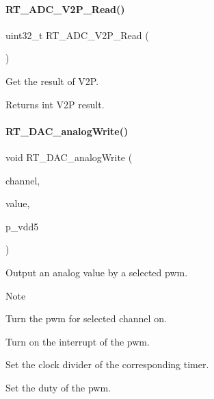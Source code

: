 \paragraph{\texorpdfstring{R\+T\+\_\+\+A\+D\+C\+\_\+\+V2\+P\+\_\+\+Read()}{RT\_ADC\_V2P\_Read()}}
{\footnotesize\ttfamily uint32\+\_\+t R\+T\+\_\+\+A\+D\+C\+\_\+\+V2\+P\+\_\+\+Read (\begin{DoxyParamCaption}{ }\end{DoxyParamCaption})}



Get the result of V2P. 

\begin{DoxyReturn}{Returns}
int V2P result. 
\end{DoxyReturn}
\mbox{\label{a00002_ae07217c068930cb51221cac4b42d5338}} 
\paragraph{\texorpdfstring{R\+T\+\_\+\+D\+A\+C\+\_\+analog\+Write()}{RT\_DAC\_analogWrite()}}
{\footnotesize\ttfamily void R\+T\+\_\+\+D\+A\+C\+\_\+analog\+Write (\begin{DoxyParamCaption}\item[{\mbox{\hyperlink{a00002_ae9e6d7c812d9175f04b9a2d31a74f737}{A\+N\+A\+L\+O\+G\+\_\+\+O\+U\+T\+P\+U\+T\+\_\+T}}}]{channel,  }\item[{uint32\+\_\+t}]{value,  }\item[{uint32\+\_\+t}]{p\+\_\+vdd5 }\end{DoxyParamCaption})\hspace{0.3cm}{\ttfamily [inline]}}



Output an analog value by a selected pwm. 

\begin{DoxyNote}{Note}

\begin{DoxyEnumerate}
\item Turn the pwm for selected channel on.
\item Turn on the interrupt of the pwm.
\item Set the clock divider of the corresponding timer.
\item Set the duty of the pwm. 
\end{DoxyEnumerate}
\end{DoxyNote}

